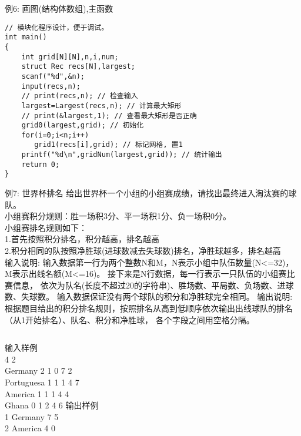 \begin{frame}{例6: 画图(结构体数组),主函数}
\begin{lstlisting}
// 模块化程序设计，便于调试。
int main()
{
    int grid[N][N],n,i,num;
    struct Rec recs[N],largest;
    scanf("%d",&n);
    input(recs,n);
    // print(recs,n); // 检查输入 
    largest=Largest(recs,n); // 计算最大矩形 
    // print(&largest,1); // 查看最大矩形是否正确 
    grid0(largest,grid); // 初始化 
    for(i=0;i<n;i++)
       grid1(recs[i],grid); // 标记网格, 置1 
    printf("%d\n",gridNum(largest,grid)); // 统计输出 
    return 0;
}
\end{lstlisting}
\end{frame}

\begin{frame}{例7: 世界杯排名}
给出世界杯一个小组的小组赛成绩，请找出最终进入淘汰赛的球队。 \\
小组赛积分规则：胜一场积3分、平一场积1分、负一场积0分。 \\
小组赛排名规则如下： \\
1.首先按照积分排名，积分越高，排名越高\\ 
2.积分相同的队按照净胜球(进球数减去失球数)排名，净胜球越多，排名越高\\ 
输入说明: 输入数据第一行为两个整数N和M，N表示小组中队伍数量(N<=32)，M表示出线名额(M<=16)。
接下来是N行数据，每一行表示一只队伍的小组赛比赛信息，
依次为队名(长度不超过20的字符串)、胜场数、平局数、负场数、进球数、失球数。
输入数据保证没有两个球队的积分和净胜球完全相同。
输出说明: 根据题目给出的积分排名规则，按照排名从高到低顺序依次输出出线球队的排名（从1开始排名）、队名、积分和净胜球，
各个字段之间用空格分隔。\\
\begin{columns}[T]
	输入样例\\	
	4 2\\ 
	Germany 2	1	0	7	2 \\
	Portuguesa 1	1	1	4	7 \\
	America 1	1	1	4	4 \\
	Ghana 0	1	2	4	6 
	输出样例\\	
	1 Germany	7 5 \\
	2 America 4 0 
\end{columns}
\medskip
\end{frame}

